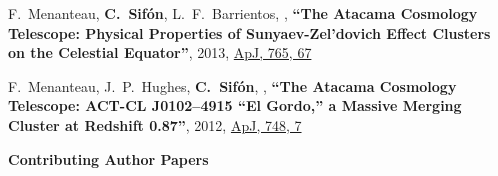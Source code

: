 \documentclass{article}
\def\myself{\textbf{\color{red} C.~Sif\'on}}
\def\apj{ApJ}
\begin{document}
\begin{etaremune}
\item
F.~Menanteau, \myself, L.~F.~Barrientos, ,
\textbf{``The Atacama Cosmology Telescope: Physical Properties of Sunyaev-Zel'dovich Effect Clusters 
on the Celestial Equator''},
2013, \href{https://ui.adsabs.harvard.edu/#abs/2013ApJ...765...67M/abstract}{\apj, 765, 67}

\item
F.~Menanteau, J.~P.~Hughes, \myself, ,
\textbf{``The Atacama Cosmology Telescope: ACT-CL J0102--4915 ``El Gordo,'' a Massive
Merging Cluster at Redshift 0.87''},
2012, \href{https://ui.adsabs.harvard.edu/#abs/2012ApJ...748....7M/abstract}{\apj, 748, 7}

\end{etaremune}

\vspace{0.4cm}
\noindent
{\bf\Large Contributing Author Papers}\\
\end{document}
